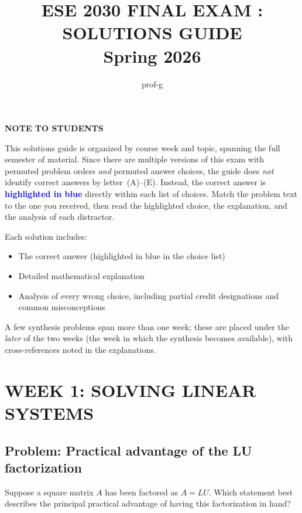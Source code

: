 \documentclass[12pt]{amsart}
\title{ESE 2030 FINAL EXAM : SOLUTIONS GUIDE \\ Spring 2026}
\author{prof-g}
\begin{document}
\maketitle

\begin{center}
{\bf NOTE TO STUDENTS}
\end{center}

This solutions guide is organized by course week and topic, spanning the full
semester of material. Since there are multiple versions of this exam with
permuted problem orders \emph{and} permuted answer choices, the guide does
\emph{not} identify correct answers by letter~(A)--(E).
Instead, the correct answer is \textcolor{blue}{\textbf{highlighted in blue}}
directly within each list of choices.
Match the problem text to the one you received, then read the highlighted
choice, the explanation, and the analysis of each distractor.

Each solution includes:
\begin{itemize}
\item The correct answer (highlighted in blue in the choice list)
\item Detailed mathematical explanation
\item Analysis of every wrong choice, including partial credit designations and common misconceptions
\end{itemize}

A few synthesis problems span more than one week; these are placed under the
\emph{later} of the two weeks (the week in which the synthesis becomes
available), with cross-references noted in the explanations.

\newpage

\section*{WEEK 1: SOLVING LINEAR SYSTEMS}

\subsection*{Problem: Practical advantage of the LU factorization}

Suppose a square matrix $A$ has been factored as $A = LU$. Which statement
best describes the principal practical advantage of having this factorization
in hand?
\end{document}
